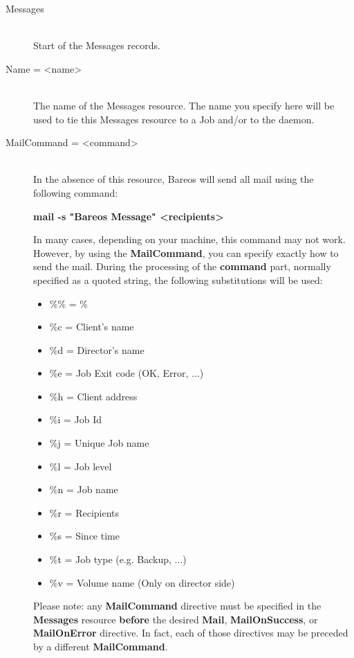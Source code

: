 \begin{description}

\item [Messages] \hfill \\
Start of the Messages records.

\item [Name = {\textless}name{\textgreater}] \hfill \\
The name of the Messages resource.  The name you specify here will be used to
tie this Messages  resource to a Job and/or to the daemon.

\label{mailcommand}
\item [MailCommand = {\textless}command{\textgreater}] \hfill \\
In the absence of this resource,  Bareos will send all mail using the
following command:

{\bf mail -s "Bareos Message" {\textless}recipients{\textgreater}}

In many cases, depending on your machine, this command may not work.
However, by using the {\bf MailCommand}, you can specify exactly how to
send the mail.  During the processing of the {\bf command} part, normally
specified as a quoted string, the following substitutions will be used:

\begin{itemize}
\item \%\% = \%
\item \%c = Client's name
\item \%d = Director's name
\item \%e = Job Exit code (OK, Error, ...)
\item \%h = Client address
\item \%i = Job Id
\item \%j = Unique Job name
\item \%l = Job level
\item \%n = Job name
\item \%r = Recipients
\item \%s = Since time
\item \%t = Job type (e.g. Backup, ...)
\item \%v = Volume name (Only on director side)
\end{itemize}

Please note: any {\bf MailCommand} directive must be specified
in the {\bf Messages} resource {\bf before} the desired
{\bf Mail}, {\bf MailOnSuccess}, or {\bf MailOnError}
directive. In fact, each of those directives may be preceded by
a different {\bf MailCommand}.


\end{description}
